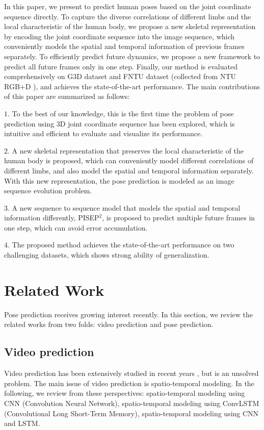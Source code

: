 \documentclass[journal]{IEEEtran}
\begin{document}
In this paper, we present to predict human poses based on the joint coordinate sequence directly. To capture the diverse correlations of different limbs and the local characteristic of the human body, we propose a new skeletal representation by encoding the joint coordinate sequence into the image sequence, which conveniently models the spatial and temporal information of previous frames separately. To efficiently predict future dynamics, we propose a new framework to predict all future frames only in one step. Finally, our method is evaluated comprehensively on G${3}$D \cite{g3d} dataset and FNTU dataset (collected from NTU RGB+D \cite{AmirNTU}), and achieves the state-of-the-art performance.
The main contributions of this paper are summarized as follows:

${1}$. To the best of our knowledge, this is the first time the problem of pose prediction using ${3}$D joint coordinate sequence has been explored, which is intuitive and efficient to evaluate and visualize its performance.

${2}$. A new skeletal representation that preserves the local characteristic of the human body is proposed, which can conveniently model different correlations of different limbs, and also model the spatial and temporal information separately. With this new representation, the pose prediction is modeled as an image sequence evolution problem.

${3}$. A new sequence to sequence model that models the spatial and temporal information differently, PISEP${^2}$, is proposed to predict multiple future frames in one step, which can avoid error accumulation.

${4}$. The proposed method achieves the state-of-the-art performance on two challenging datasets, which shows strong ability of generalization.


\section{Related Work}
Pose prediction receives growing interest recently. In this section, we review the related works from two folds: video prediction and pose prediction.

\subsection{Video prediction}

Video prediction has been extensively studied in recent years \cite{dpcvpul,ostdfvp,fdtvp,pfuvp,dmspms}, but is an unsolved problem. The main issue of video prediction is spatio-temporal modeling. In the following, we review from these perspectives: spatio-temporal modeling using CNN (Convolution Neural Network), spatio-temporal modeling using ConvLSTM (Convolutional Long Short-Term Memory), spatio-temporal modeling using CNN and LSTM.
\end{document}
